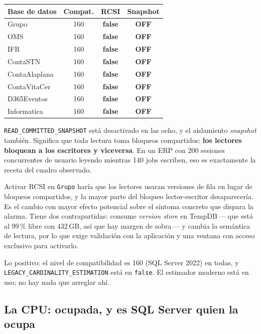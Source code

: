 \documentclass[11pt,a4paper]{article}
\newcommand{\cod}[1]{\texttt{\small #1}}
\newcommand{\critico}[1]{\textcolor{rojo}{\textbf{#1}}}
\begin{document}
\begin{table}[h]
\centering
\small
\begin{tabular}{lccc}
\toprule
\textbf{Base de datos} & \textbf{Compat.} & \textbf{RCSI} &
\textbf{Snapshot} \\
\midrule
Grupo         & 160 & \critico{false} & \critico{OFF} \\
OMS           & 160 & \critico{false} & \critico{OFF} \\
IFR           & 160 & \critico{false} & \critico{OFF} \\
ContaSTN      & 160 & \critico{false} & \critico{OFF} \\
ContaAlaplana & 160 & \critico{false} & \critico{OFF} \\
ContaVitaCer  & 160 & \critico{false} & \critico{OFF} \\
D365Eventos   & 160 & \critico{false} & \critico{OFF} \\
Informatica   & 160 & \critico{false} & \critico{OFF} \\
\bottomrule
\end{tabular}
\end{table}

\cod{READ\_COMMITTED\_SNAPSHOT} está desactivado en las ocho, y el aislamiento
\emph{snapshot} también. Significa que toda lectura toma bloqueos
compartidos: \textbf{los lectores bloquean a los escritores y viceversa}. En
un ERP con 200 sesiones concurrentes de usuario leyendo mientras 140 jobs
escriben, eso es exactamente la receta del cuadro observado.

Activar RCSI en \cod{Grupo} haría que los lectores usaran versiones de fila en
lugar de bloqueos compartidos, y la mayor parte del bloqueo lector-escritor
desaparecería. Es el cambio con mayor efecto potencial sobre el síntoma
concreto que dispara la alarma. Tiene dos contrapartidas: consume
\emph{version store} en TempDB —\,que está al 99\,\% libre con 432\,GB, así
que hay margen de sobra\,— y cambia la semántica de lectura, por lo que exige
validación con la aplicación y una ventana con acceso exclusivo para
activarlo.

Lo positivo: el nivel de compatibilidad es 160 (SQL Server 2022) en todas, y
\cod{LEGACY\_CARDINALITY\_ESTIMATION} está en \cod{false}. El estimador
moderno está en uso; no hay nada que arreglar ahí.

\subsection{La CPU: ocupada, y es SQL Server quien la ocupa}
\end{document}
